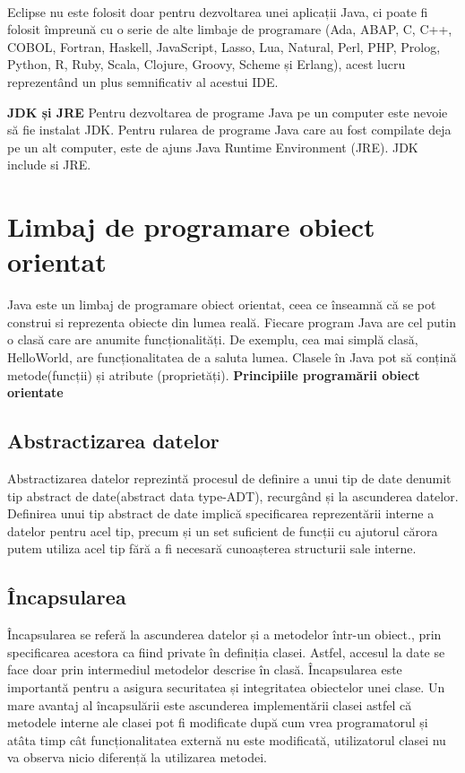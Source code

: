 \paragraph{ }Eclipse nu este folosit doar pentru dezvoltarea unei aplicații Java, ci poate fi folosit împreună cu o serie de alte limbaje de programare (Ada, ABAP, C, C++, COBOL, Fortran, Haskell, JavaScript, Lasso, Lua, Natural, Perl, PHP, Prolog, Python, R, Ruby, Scala, Clojure, Groovy, Scheme și Erlang), acest lucru reprezentând un plus semnificativ al acestui IDE.\newline



\textbf{JDK și JRE}\newline
Pentru dezvoltarea de programe Java pe un computer este nevoie să fie instalat JDK. Pentru rularea de programe Java care au fost compilate deja pe un alt computer, este de ajuns Java Runtime Environment (JRE). 
JDK include si JRE.

\section{Limbaj de programare obiect orientat}

Java este un limbaj de programare obiect orientat, ceea ce înseamnă că se pot construi si reprezenta obiecte din lumea reală. Fiecare program Java are cel putin o clasă care are anumite funcționalități. De exemplu, cea mai simplă clasă, HelloWorld, are funcționalitatea de a saluta lumea.
Clasele în Java pot să conțină metode(funcții) și atribute (proprietăți).\newline
\textbf{Principiile programării obiect orientate }\newline
\subsection{Abstractizarea datelor}
Abstractizarea datelor reprezintă procesul de definire a unui tip de date denumit tip abstract de date(abstract data type-ADT), recurgând și la ascunderea datelor.
Definirea unui tip abstract de date implică specificarea reprezentării interne a datelor pentru acel tip, precum și un set suficient de funcții cu ajutorul cărora putem utiliza acel tip fără a fi necesară cunoașterea structurii sale interne. \cite{15}

\subsection{Încapsularea}
Încapsularea se referă la ascunderea datelor și a metodelor într-un obiect., prin specificarea acestora ca fiind private în definiția clasei. Astfel, accesul la date se face doar prin intermediul metodelor descrise în clasă. Încapsularea este importantă pentru a asigura securitatea și integritatea obiectelor unei clase.  
Un mare avantaj al încapsulării este ascunderea implementării clasei astfel că metodele interne ale clasei pot fi modificate după cum vrea programatorul și atâta timp cât funcționalitatea externă nu este modificată, utilizatorul clasei nu va observa nicio diferență la utilizarea metodei.\cite{14}


